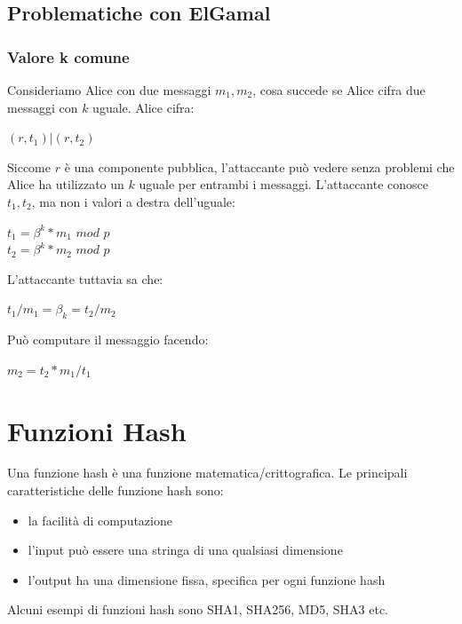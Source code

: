 \documentclass[11pt, oneside]{article}   	%
\begin{document}
\subsection*{Problematiche con ElGamal}
\subsubsection*{Valore k comune}
Consideriamo Alice con due messaggi $m_1, m_2$, cosa succede se Alice cifra due messaggi con $k$ uguale. Alice cifra:
\begin{center}
$(r, t_1) | (r, t_2)$
\end{center}
Siccome $r$  è una componente pubblica, l'attaccante può vedere senza problemi che Alice ha utilizzato un $k$ uguale per entrambi i messaggi. L'attaccante conosce $t_1, t_2$, ma non i valori a destra dell'uguale:
\begin{center}
$t_1 = \beta^k * m_1$ $mod$ $p$\\
$t_2 = \beta^k * m_2$ $mod$ $p$
\end{center}
L'attaccante tuttavia sa che:
\begin{center}
$t_1/m_1 = \beta_k = t_2/m_2$
\end{center}
Può computare il messaggio facendo:
\begin{center}
$m_2 = t_2  * m_1/t_1$
\end{center}

\section*{Funzioni Hash}
Una funzione hash è una funzione matematica/crittografica. Le principali caratteristiche delle funzione hash sono:\begin{itemize}
\item la facilità di computazione
\item l'input può essere una stringa di una qualsiasi dimensione
\item l'output ha una dimensione fissa, specifica per ogni funzione hash
\end{itemize}
Alcuni esempi di funzioni hash sono SHA1, SHA256, MD5, SHA3 etc.
\end{document}
